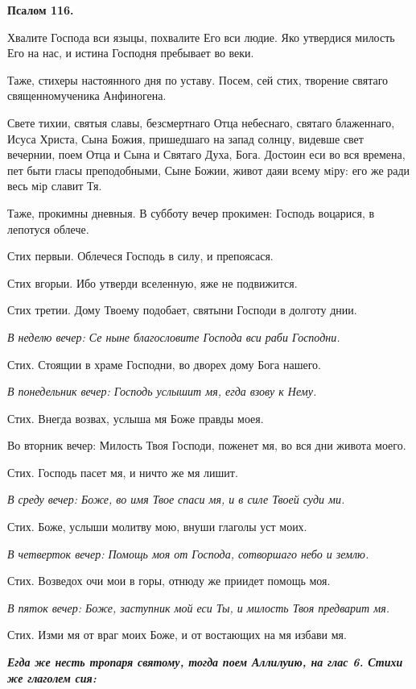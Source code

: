 \medskip


\bfseries Псалом 116.\normalfont{}


Хвалите Господа вси языцы, похвалите Его вси людие. Яко утвердися милость Его на нас, и истина Господня пребывает во веки.

Таже, стихеры настоянного дня по уставу. Посем, сей стих, творение святаго священномученика Анфиногена.

Свете тихии, святыя славы, безсмертнаго Отца небеснаго, святаго блаженнаго, Исуса Христа, Сына Божия, пришедшаго на запад солнцу, видевше свет вечернии, поем Отца и Сына и Святаго Духа, Бога. Достоин еси во вся времена, пет быти гласы преподобными, Сыне Божии, живот даяи всему мiру: его же ради весь мiр славит Тя.

Таже, прокимны дневныя. В субботу вечер прокимен: Господь воцарися, в лепотуся облече. 

Стих первыи. Облечеся Господь в силу, и препоясася.

Стих вгорыи. Ибо утверди вселенную, яже не подвижится.

Стих третии. Дому Твоему подобает, святыни Господи в долготу днии.


\itshape В неделю вечер:\normalfont{} Се ныне благословите Господа вси раби Господни.

Стих. Стоящии в храме Господни, во дворех дому Бога нашего.


\itshape В понедельник вечер:\normalfont{} Господь услышит мя, егда взову к Нему.

Стих. Внегда возвах, услыша мя Боже правды моея.


Во вторник вечер: Милость Твоя Господи, поженет мя, во вся дни живота моего.

Стих. Господь пасет мя, и ничто же мя лишит.


\itshape В среду вечер:\normalfont{} Боже, во имя Твое спаси мя, и в силе Твоей суди ми.

Стих. Боже, услыши молитву мою, внуши глаголы уст моих.


\itshape В четверток вечер:\normalfont{} Помощь моя от Господа, сотворшаго небо и землю.

Стих. Возведох очи мои в горы, отнюду же приидет помощь моя.


\itshape В пяток вечер:\normalfont{} Боже, заступник мой еси Ты, и милость Твоя предварит мя.

Стих. Изми мя от враг моих Боже, и от востающих на мя избави мя.


\bfseries \itshape Егда же несть тропаря святому, тогда поем Аллилуию, на глас 6. Стихи же глаголем сия:\normalfont{}\normalfont{}


